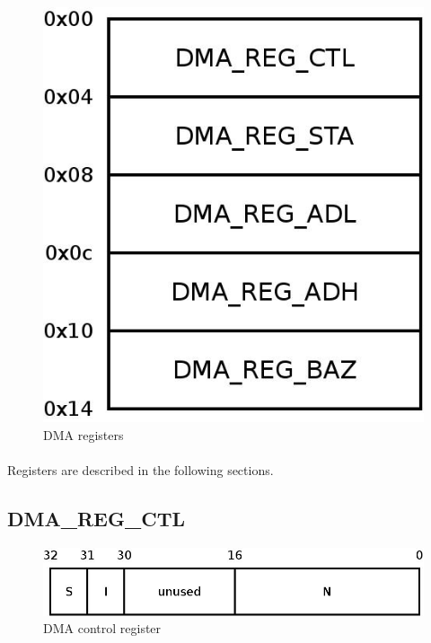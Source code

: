 \documentclass[a4paper, 11pt]{article}
\begin{document}
\begin{figure}[!h]
\begin{center}
\includegraphics[scale=0.20]{../pic/dma_regs/main.jpeg}
\end{center}
\caption{\tiny{DMA registers}}
\label{dma_regs}
\end{figure}

\paragraph{}
Registers are described in the following sections.

\newpage
\subsection{DMA\_REG\_CTL}

\begin{figure}[!h]
\begin{center}
\includegraphics[scale=0.20]{../pic/dma_reg_ctl/main.jpeg}
\end{center}
\caption{\tiny{DMA control register}}
\label{dma_reg_ctl}
\end{figure}
\end{document}
